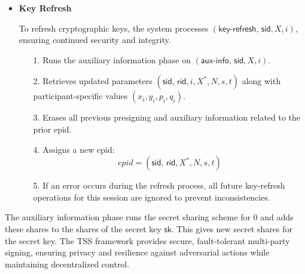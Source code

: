 \begin{itemize}
    \item \textbf{Key Refresh}  
    
    To refresh cryptographic keys, the system processes $(\textsf{key-refresh, sid}, X, i)$, ensuring continued security and integrity.  
    \begin{itemize}
        \item[1.] Runs the auxiliary information phase on $(\textsf{aux-info, sid}, X, i)$.  
        \item[2.] Retrieves updated parameters $(\textsf{sid, rid}, i, X^*, N, s, t)$ along with participant-specific values $(x_i, y_i, p_i, q_i)$.  
        \item[3.] Erases all previous presigning and auxiliary information related to the prior \textsf{epid}.  
        \item[4.] Assigns a new \textsf{epid}:  
   \[
   epid = (\textsf{sid, rid}, X^*, N, s, t)
   \]
        \item[5.] If an error occurs during the refresh process, all future key-refresh operations for this session are ignored to prevent inconsistencies.  
    \end{itemize}

\end{itemize}

The auxiliary information phase runs the secret sharing scheme for $0$ and adds these shares to the shares of the secret key $\textsf{sk}$. This gives new secret shares for the secret key. The TSS framework provides secure, fault-tolerant multi-party signing, ensuring privacy and resilience against adversarial actions while maintaining decentralized control.




